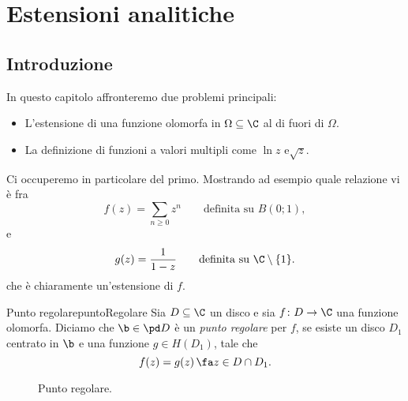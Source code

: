 \chapter{Estensioni analitiche}
%
%
\section{Introduzione}

In questo capitolo affronteremo due problemi principali:
\begin{itemize}
	\item L'estensione di una funzione olomorfa in \(\Omega\subseteq\C\) al di fuori di \(\Omega\).
	\item La definizione di funzioni a valori multipli come \(\ln z\) e\(\sqrt{z}\).
\end{itemize}
Ci occuperemo in particolare del primo. Mostrando ad esempio quale relazione vi è fra
\[
	f(z) = \sum_{n\ge 0} z^n \qquad\text{definita su }B(0;1),
\]
e
\[
	g(z) = \frac{1}{1-z} \qquad\text{definita su }\C\setminus\{1\}.
\]
che è chiaramente un'estensione di \(f\).

\begin{defn}{Punto regolare}{puntoRegolare}
	Sia \(D\subseteq\C\) un disco e sia \(f\colon D \to \C\) una funzione olomorfa.
	Diciamo che \(\b\in \pd D\) è un \emph{punto regolare} per \(f\), se esiste un disco \(D_1\) centrato in \(\b\) e una funzione \(g\in H(D_1)\), tale che
	\[
		f(z) = g(z)\,\fa z\in D\cap D_1.
	\]
\end{defn}

\begin{figure}[tp]
	\centering
	\caption{Punto regolare.}
\end{figure}

